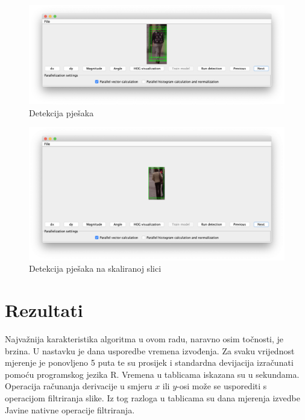\documentclass[times, utf8, zavrsni]{fer}
\begin{document}
\begin{figure}[htb]
	\centering
	\includegraphics[width=\linewidth]{figures/detection.png}
	\caption{Detekcija pješaka}
	\label{fig:detection}
\end{figure}

\begin{figure}[htb]
	\centering
	\includegraphics[width=\linewidth]{figures/scaledDetection.png}
	\caption{Detekcija pješaka na skaliranoj slici}
	\label{fig:scaledDetection}
\end{figure}

\chapter{Rezultati}
Najvažnija karakteristika algoritma u ovom radu, naravno osim točnosti, je brzina. U nastavku je dana usporedbe vremena izvođenja. Za svaku vrijednost mjerenje je ponovljeno 5 puta te su prosijek i standardna devijacija izračunati pomoću programskog jezika R. Vremena u tablicama iskazana su u sekundama. \\

Operacija računanja derivacije u smjeru \(x\) ili \(y\)-osi može se usporediti s operacijom filtriranja slike. Iz tog razloga u tablicama su dana mjerenja izvedbe Javine nativne operacije filtriranja.
\end{document}
